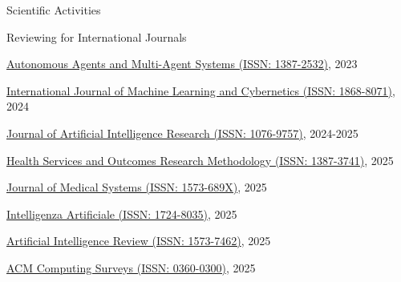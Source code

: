 \documentclass{resume} %
\begin{document}
\begin{rSection}{Scientific Activities}

        \begin{rSubsection2}{Reviewing for International Journals}
            \item \href{https://link.springer.com/journal/10458}{Autonomous Agents and Multi-Agent Systems (ISSN: 1387-2532)}, 2023
            \item \href{https://link.springer.com/journal/13042}{International Journal of Machine Learning and Cybernetics (ISSN: 1868-8071)}, 2024
            \item \href{https://www.jair.org/index.php/jair/index}{Journal of Artificial Intelligence Research (ISSN: 1076-9757)}, 2024-2025
            \item \href{https://link.springer.com/journal/10742}{Health Services and Outcomes Research Methodology (ISSN: 1387-3741)}, 2025
            \item \href{https://link.springer.com/journal/10916}{Journal of Medical Systems (ISSN: 1573-689X)}, 2025
            \item \href{https://journals.sagepub.com/home/INA}{Intelligenza Artificiale (ISSN: 1724-8035)}, 2025
            \item \href{https://link.springer.com/journal/10462}{Artificial Intelligence Review (ISSN: 1573-7462)}, 2025
            \item \href{https://dl.acm.org/journal/csur}{ACM Computing Surveys (ISSN: 0360-0300)}, 2025
        \end{rSubsection2}



\end{rSection}
\end{document}
